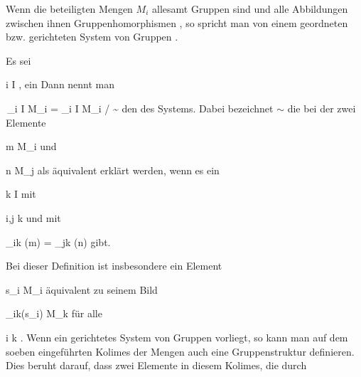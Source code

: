 Wenn die beteiligten Mengen $M_i$ allesamt Gruppen
 {} {}
sind und alle Abbildungen zwischen ihnen Gruppenhomorphismen
 {} {,}
so spricht man von einem geordneten bzw. gerichteten System von Gruppen
 {} {.}


{}
{





Es sei

 {}
 {i \in I} {}
 {} {} {} {,}
ein
Dann nennt man

\mavergleichskettedisp
{\vergleichskette
{ \,_{i \in I} M_i
}
{ =} { \biguplus_{i \in I} M_i / \sim
}
{ } {
}
{ } {
}
{ } {
}
}
{}{}{}
den 
 {} {}
des Systems. Dabei bezeichnet $\sim$ die
bei der zwei Elemente

\mavergleichskette
{\vergleichskette
{ m
}
{ \in }{ M_i
}
{  }{
}
{    }{
}
{   }{
}
}
{}{}{}
und

\mavergleichskette
{\vergleichskette
{ n
}
{ \in }{ M_j
}
{  }{
}
{    }{
}
{   }{
}
}
{}{}{}
als äquivalent erklärt werden, wenn es ein

\mavergleichskette
{\vergleichskette
{ k
}
{ \in }{ I
}
{  }{
}
{    }{
}
{   }{
}
}
{}{}{}
mit

\mavergleichskette
{\vergleichskette
{ i,j
}
{ \preccurlyeq }{ k
}
{  }{
}
{    }{
}
{   }{
}
}
{}{}{}
und mit

\mavergleichskettedisp
{\vergleichskette
{ \varphi_{ik} (m)
}
{ =} { \varphi_{jk} (n)
}
{ } {
}
{ } {
}
{ } {
}
}
{}{}{}
gibt.





}

Bei dieser Definition ist insbesondere ein Element

\mavergleichskette
{\vergleichskette
{s_i
}
{ \in }{ M_i
}
{  }{
}
{    }{
}
{   }{
}
}
{}{}{}
äquivalent zu seinem Bild

\mavergleichskette
{\vergleichskette
{ \varphi_{ik}(s_i)
}
{ \in }{ M_k
}
{  }{
}
{    }{
}
{   }{
}
}
{}{}{}
für alle

\mavergleichskette
{\vergleichskette
{i
}
{ \preccurlyeq }{ k
}
{  }{
}
{    }{
}
{   }{
}
}
{}{}{.}
Wenn ein gerichtetes System von Gruppen
 {} {}
vorliegt, so kann man auf dem soeben eingeführten Kolimes der Mengen auch eine Gruppenstruktur
 {} {}
definieren. Dies beruht darauf, dass zwei Elemente in diesem Kolimes, die durch

